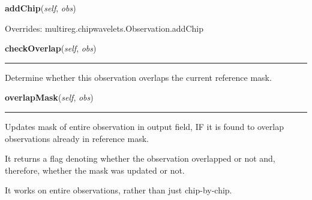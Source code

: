     \begin{boxedminipage}{\textwidth}

    \raggedright \textbf{addChip}(\textit{self}, \textit{obs})

      Overrides: multireg.chipwavelets.Observation.addChip

    \end{boxedminipage}

    \label{multireg:chipwavelets:ReferenceObs:checkOverlap}
    \vspace{0.5ex}

    \begin{boxedminipage}{\textwidth}

    \raggedright \textbf{checkOverlap}(\textit{self}, \textit{obs})

    \vspace{-1.5ex}

    \rule{\textwidth}{0.5\fboxrule}
    Determine whether this observation overlaps the current reference 
    mask.

    \vspace{1ex}

    \end{boxedminipage}

    \label{multireg:chipwavelets:ReferenceObs:overlapMask}
    \vspace{0.5ex}

    \begin{boxedminipage}{\textwidth}

    \raggedright \textbf{overlapMask}(\textit{self}, \textit{obs})

    \vspace{-1.5ex}

    \rule{\textwidth}{0.5\fboxrule}
    Updates mask of entire observation in output field, IF it is found to 
    overlap observations already in reference mask.

    It returns a flag denoting whether the observation overlapped or not 
    and, therefore, whether the mask was updated or not.

    It works on entire observations, rather than just chip-by-chip.

    \vspace{1ex}

    \end{boxedminipage}

